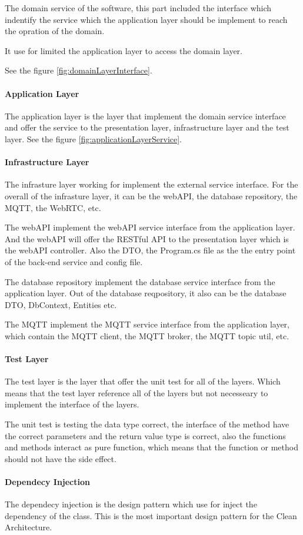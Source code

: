 

The domain service of the software, this part included the interface 
which indentify the service which the application layer should be implement
to reach the opration of the domain. 

It use for limited the application layer to access the domain layer. 

See the figure \ref{fig:domainLayerInterface}.


\paragraph{Application Layer}
The application layer is the layer that implement the domain service interface
and offer the service to the presentation layer, infrastructure layer and the test layer.
See the figure \ref{fig:applicationLayerService}.


\paragraph{Infrastructure Layer}
The infrasture layer working for implement the external service interface.
For the overall of the infrasture layer, it can be the webAPI, the database repository, the MQTT, the WebRTC, etc.

The webAPI implement the webAPI service interface from the application layer.
And the webAPI will offer the RESTful API to the presentation layer which is the webAPI controller.
Also the DTO, the Program.cs file as the the entry point of the back-end service and config file.

The database repository implement the database service interface from the application layer.
Out of the database reqpository, it also can be the database DTO, DbContext, Entities etc.

The MQTT implement the MQTT service interface from the application layer, which contain the MQTT client,
the MQTT broker, the MQTT topic util, etc.

\paragraph{Test Layer}
The test layer is the layer that offer the unit test for all of the layers. Which means that the test layer
reference all of the layers but not necesseary to implement the interface of the layers.

The unit test is testing the data type correct, the interface of the method have the correct parameters 
and the return value type is correct, also the functions and methods interact as pure function, 
which means that the function or method should not have the side effect. 

\paragraph{Dependecy Injection}
The dependecy injection is the design pattern which use for inject the dependency of the class.
This is the most important design pattern for the Clean Architecture.

\pagebreak